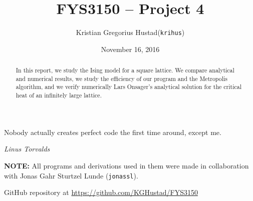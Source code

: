 \documentclass[a4paper]{article}
\begin{document}
\title{FYS3150 -- Project 4}
\author{
    \begin{tabular}{r l}
        Kristian Gregorius Hustad & (\texttt{krihus})
    \end{tabular}}
\date{November 16, 2016}    %

\maketitle




\setlength{\epigraphwidth}{0.75\textwidth}
\renewcommand{\epigraphflush}{center}
\renewcommand{\beforeepigraphskip}{50pt}
\renewcommand{\afterepigraphskip}{100pt}
\renewcommand{\epigraphsize}{\normalsize}

\epigraph{Nobody actually creates perfect code the first time around, except me.}
{\textit{Linus Torvalds}}


\begin{abstract}
\noindent
In this report, we study the Ising model for a square lattice. We compare analytical and numerical results, we study the efficiency of our program and the Metropolis algorithm, and we verify numerically Lars Onsager's analytical solution for the critical heat of an infinitely large lattice.
\end{abstract}

\vfill

\textbf{NOTE:} All programs and derivations used in them were made in collaboration with Jonas Gahr Sturtzel Lunde (\texttt{jonassl}).

\bigskip
\begin{center}
    GitHub repository at \url{https://github.com/KGHustad/FYS3150}
\end{center}

\newpage

\newcommand{\half}{\frac{1}{2}}
\newcommand{\dt}{{\Delta t}}
\newcommand{\dx}{{\Delta x}}
\newcommand{\bigO}{{\mathcal{O}}}

\newcommand{\stateset}{{\mathcal{S}}}
\newcommand{\expectation}[1]{{\langle #1 \rangle}}

\newcommand{\upspin}{\uparrow}
\newcommand{\downspin}{{\color{red}\downarrow}}
\end{document}
